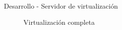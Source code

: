\begin{frame}{Desarrollo - Servidor de virtualización}
    \begin{figure}[!tbp]
      \centering
      \begin{minipage}[b]{0.4\textwidth}
        \caption{\scriptsize Virtualización completa}
      \end{minipage}
      \hfill
      \begin{minipage}[b]{0.4\textwidth}

\end{minipage}
\end{figure}
\end{frame}
